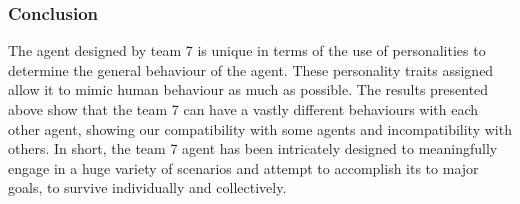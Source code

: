 \subsubsection{Conclusion}
The agent designed by team 7 is unique in terms of the use of personalities to determine the general behaviour of the agent. These personality traits assigned allow it to mimic human behaviour as much as possible. The results presented above show that the team 7 can have a vastly different behaviours with each other agent, showing our compatibility with some agents and incompatibility with others. In short, the team 7 agent has been intricately designed to meaningfully engage in a huge variety of scenarios and attempt to accomplish its to major goals, to survive individually and collectively.